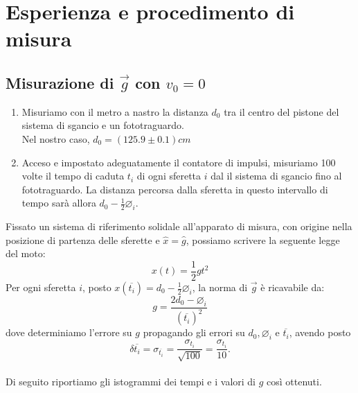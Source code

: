 \documentclass{article}
\newcommand*{\diam}{\varnothing}
\newcommand*{\best}[1]{{#1}_\text{best}}
\newcommand*{\bestp}[1]{{\left(#1\right)}_\text{best}}
\newcommand*{\errrel}[1]{\frac{\delta #1}{{#1}_\text{best}}}
\begin{document}
\section{Esperienza e procedimento di misura}
\subsection{Misurazione di $\vec{g}$ con $v_0=0$}
\begin{enumerate}
    \item Misuriamo con il metro a nastro la distanza $d_0$ tra il centro
          del pistone del sistema di sgancio e un fototraguardo.\\
          Nel nostro caso, $d_0 = \left(125.9\pm 0.1\right)\unit{cm}$
    \item Acceso e impostato adeguatamente il contatore di impulsi,
          misuriamo 100 volte il tempo di caduta $t_i$
          di ogni sferetta $i$ dal il sistema di sgancio fino al fototraguardo.
          La distanza percorsa dalla sferetta in questo intervallo di tempo
          sarà allora $d_0 - \frac{1}{2}\diam_i$.
\end{enumerate}

Fissato un sistema di riferimento solidale all'apparato di misura, con origine
nella posizione di partenza delle sferette e $\hat{x} = \hat{g}$, possiamo
scrivere la seguente legge del moto:
\[x(t) = \frac{1}{2}g t^2\]
Per ogni sferetta $i$, posto $x\left(\overline{t_i}\right) = d_0 - \frac{1}{2}\diam_i$,
la norma di $\vec{g}$ è ricavabile da:
\[
    g = \frac{2d_0 - \diam_i}{\left(\overline{t_i}\right)^2}
\]
dove determiniamo l'errore su $g$ propagando gli errori su $d_0,\diam_i$ e
$\overline{t_i}$, avendo posto
\[
    \delta\overline{t_i} =
    \sigma_{\overline{t_i}} =
    \frac{\sigma_{t_i}}{\sqrt{100}} =
    \frac{\sigma_{t_i}}{10}.
\]
\\

Di seguito riportiamo gli istogrammi dei tempi e i valori di $g$ così ottenuti.
\end{document}
